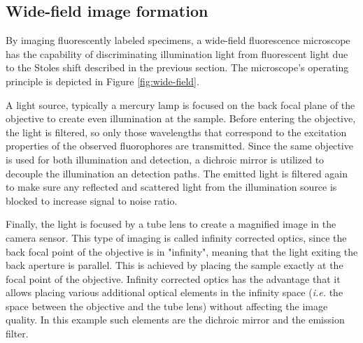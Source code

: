 

  \subsection{Wide-field image formation}
    By imaging fluorescently labeled specimens, a wide-field fluorescence microscope has the capability of discriminating illumination light from fluorescent light due to the Stoles shift described in the previous section. The microscope's operating principle is depicted in Figure \ref{fig:wide-field}.

    A light source, typically a mercury lamp is focused on the back focal plane of the objective to create even illumination at the sample. Before entering the objective, the light is filtered, so only those wavelengths that correspond to the excitation properties of the observed fluorophores are transmitted. Since the same objective is used for both illumination and detection, a dichroic mirror is utilized to decouple the illumination an detection paths. The emitted light is filtered again to make sure any reflected and scattered light from the illumination source is blocked to increase signal to noise ratio.

    Finally, the light is focused by a tube lens to create a magnified image in the camera sensor. This type of imaging is called infinity corrected optics, since the back focal point of the objective is in "infinity", meaning that the light exiting the back aperture is parallel. This is achieved by placing the sample exactly at the focal point of the objective. Infinity corrected optics has the advantage that it allows placing various additional optical elements in the infinity space (\textit{i.e.} the space between the objective and the tube lens) without affecting the image quality. In this example such elements are the dichroic mirror and the emission filter. 

